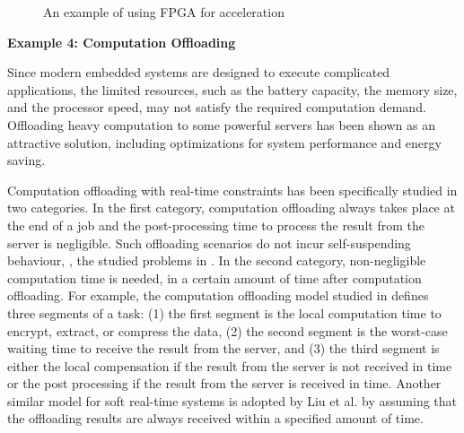 \begin{figure}[t]
{{}       }
  \caption{An example of using FPGA for acceleration}
  \label{fig:example-fpga}
\end{figure}


{\bf Example 4: Computation Offloading}
 
Since modern embedded systems are designed to execute complicated applications, the limited resources, such as the battery capacity, the memory size, and the processor speed, may not satisfy the required computation demand. Offloading heavy computation to some powerful servers has been shown as an attractive solution, including optimizations for system performance and energy saving.

Computation offloading with real-time constraints has been specifically studied in two categories. In the first category, computation offloading always takes place at the end of a job and the post-processing time to process the result from the server is negligible. Such offloading scenarios do not incur self-suspending behaviour, \eg, the studied problems in \cite{nimmagadda2010real,DBLP:conf/ecrts/TomaC13}. In the second category, non-negligible computation time is needed, in a certain amount of time after computation offloading. For example, the computation offloading model studied in \cite{Liu_2014} defines three segments of a task: (1) the first segment is the local computation time to encrypt, extract, or compress the data, (2) the second segment is the worst-case waiting time to receive the result from the server, and (3) the third segment is either the local compensation if the result from the server is not received in time or the post processing if the result from the server is received in time. Another similar model for soft real-time systems is adopted by Liu et al. \cite{DBLP:conf/ecrts/LiuLZGH015} by assuming that the offloading results are always received within a specified amount of time.

